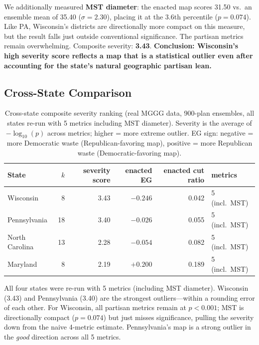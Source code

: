 \documentclass[11pt]{article}
\begin{document}
We additionally measured \textbf{MST diameter}: the enacted map scores
31.50 vs.\ an ensemble mean of 35.40 ($\sigma = 2.30$), placing it at the
3.6th percentile ($p = 0.074$). Like PA, Wisconsin's districts are
directionally more compact on this measure, but the result falls just
outside conventional significance. The partisan metrics remain overwhelming.
Composite severity: \textbf{3.43}.
\textbf{Conclusion: Wisconsin's high severity score reflects a map that
is a statistical outlier even after accounting for the state's natural
geographic partisan lean.}

\subsection{Cross-State Comparison}

\begin{table}[h]
  \centering
  \begin{tabular}{lrrrrl}
  \toprule
  State & $k$ & severity score & enacted EG & enacted cut ratio & metrics \\
  \midrule
  Wisconsin      & 8  & 3.43 & $-0.246$ & 0.042 & 5 (incl.\ MST) \\
  Pennsylvania   & 18 & 3.40 & $-0.026$ & 0.055 & 5 (incl.\ MST) \\
  North Carolina & 13 & 2.28 & $-0.054$ & 0.082 & 5 (incl.\ MST) \\
  Maryland       & 8  & 2.19 & $+0.200$ & 0.189 & 5 (incl.\ MST) \\
  \bottomrule
  \end{tabular}
  \caption{Cross-state composite severity ranking (real MGGG data, 900-plan
    ensembles, all states re-run with 5 metrics including MST diameter).
    Severity is the average of $-\log_{10}(p)$ across metrics;
    higher = more extreme outlier. EG sign: negative = more Democratic waste
    (Republican-favoring map), positive = more Republican waste
    (Democratic-favoring map).}
  \label{tab:cross}
\end{table}

All four states were re-run with 5 metrics (including MST diameter).
Wisconsin (3.43) and Pennsylvania (3.40) are the strongest outliers---within
a rounding error of each other. For Wisconsin, all partisan metrics remain
at $p < 0.001$; MST is directionally compact ($p = 0.074$) but just misses
significance, pulling the severity down from the naive 4-metric estimate.
Pennsylvania's map is a strong outlier in the \emph{good} direction across
all 5 metrics.
\end{document}
